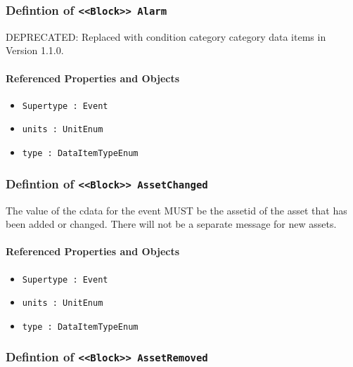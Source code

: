 \subsubsection{Defintion of \texttt{<<Block>> Alarm}}
  \label{type:Alarm}

\FloatBarrier

DEPRECATED: Replaced with condition category category data items in Version 1.1.0.

\FloatBarrier
\paragraph{Referenced Properties and Objects}

\begin{itemize}
\item \texttt{Supertype : Event}

\item \texttt{units : UnitEnum}

\item \texttt{type : DataItemTypeEnum}

\end{itemize}
\FloatBarrier
\subsubsection{Defintion of \texttt{<<Block>> AssetChanged}}
  \label{type:AssetChanged}

\FloatBarrier

The value of the cdata for the event MUST be the assetid of the asset that has been added or changed. There will not be a separate message for new assets.

\FloatBarrier
\paragraph{Referenced Properties and Objects}

\begin{itemize}
\item \texttt{Supertype : Event}

\item \texttt{units : UnitEnum}

\item \texttt{type : DataItemTypeEnum}

\end{itemize}
\FloatBarrier
\subsubsection{Defintion of \texttt{<<Block>> AssetRemoved}}
  \label{type:AssetRemoved}

